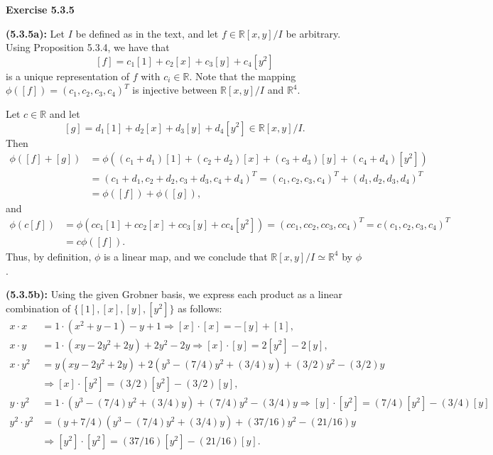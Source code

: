\documentclass[12pt,oneside]{article}
\newenvironment{exercise}[1]{\vspace{.1in}\noindent\textbf{Exercise #1 \hspace{.05em}}}{}
\newcommand{\R}{\mathbb{R}}
\begin{document}

\begin{exercise}{5.3.5}

    \bigskip
    \textbf{(5.3.5a):}
    Let $I$ be defined as in the text, and let $f \in \R[x,y]/I$ 
    be arbitrary. Using Proposition 5.3.4, we have that 
    \[
        [f] = c_1[1]+c_2[x]+c_3[y]+c_4[y^2]    
    \]
    is a unique representation of $f$ with $c_i \in \R$. Note 
    that the mapping $\phi([f])=(c_1,c_2,c_3,c_4)^T$ is injective 
    between $\R[x,y]/I$ and $\R^4.$

    Let $c \in \R$ and let 
    \[
        [g]=d_1[1]+d_2[x]+d_3[y]+d_4[y^2] \in \R[x,y]/I.    
    \]
    Then 
    \begin{align*}
        \phi([f]+[g])   &= \phi((c_1+d_1)[1]+(c_2+d_2)[x]+(c_3+d_3)[y]+(c_4+d_4)[y^2])\\
                        &=(c_1+d_1,c_2+d_2,c_3+d_3,c_4+d_4)^T=(c_1,c_2,c_3,c_4)^T+(d_1,d_2,d_3,d_4)^T\\
                        &=\phi([f])+\phi([g]),
    \end{align*}
    and 
    \begin{align*}
        \phi(c[f])  &= \phi(cc_1[1]+cc_2[x]+cc_3[y]+cc_4[y^2])=(cc_1,cc_2,cc_3,cc_4)^T=c(c_1,c_2,c_3,c_4)^T\\
                    &=c\phi([f]).
    \end{align*}
    Thus, by definition, $\phi$ is a linear map, and we conclude that 
    $\R[x,y]/I \simeq \R^4$ by $\phi$.

    \bigskip
    \textbf{(5.3.5b):}
    Using the given Grobner basis, we express each product as a 
    linear combination of $\{[1],[x],[y],[y^2]\}$ as follows:
    \begin{align*}
        x\cdot x    &=1\cdot(x^2+y-1)-y+1 \Rightarrow [x]\cdot[x]=-[y]+[1],\\
        x\cdot y    &=1\cdot(xy-2y^2+2y)+2y^2-2y \Rightarrow [x]\cdot[y]=2[y^2]-2[y],\\
        x\cdot y^2  &=y(xy-2y^2+2y)+2(y^3-(7/4)y^2+(3/4)y)+(3/2)y^2-(3/2)y\\
                    & \Rightarrow [x]\cdot[y^2]=(3/2)[y^2]-(3/2)[y],\\
        y\cdot y^2  &=1\cdot(y^3-(7/4)y^2+(3/4)y)+(7/4)y^2-(3/4)y \Rightarrow [y]\cdot[y^2]=(7/4)[y^2]-(3/4)[y]\\
        y^2 \cdot y^2 &= (y+7/4)(y^3-(7/4)y^2+(3/4)y)+(37/16)y^2-(21/16)y\\
                    & \Rightarrow [y^2]\cdot[y^2]=(37/16)[y^2]-(21/16)[y].
    \end{align*}


\end{exercise}
\end{document}
